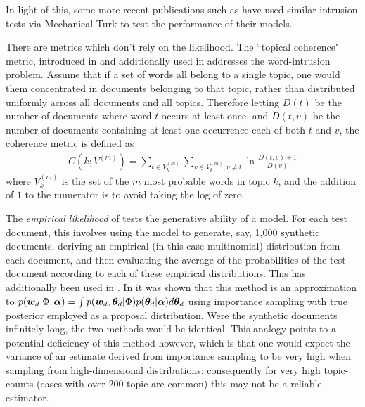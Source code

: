 
In light of this, some more recent publications such as \cite{Li2006}\cite{Wang2007}\cite{Lindsey2012} have used similar intrusion tests via Mechanical Turk to test the performance of their models.

There are metrics which don't rely on the likelihood. The ``topical coherence" metric, introduced in \cite{Mimno2011} and additionally used in \cite{Mimno2012a} addresses the word-intrusion problem. Assume that if a set of words all belong to a single topic, one would them concentrated in documents belonging to that topic, rather than distributed uniformly across all documents and all topics. Therefore letting $D(t)$ be the number of documents where word $t$ occurs at least once, and $D(t,v)$ be the number of documents containing at least one occurrence each of both $t$ and $v$, the coherence metric is defined as
\begin{align}
C(k; V^{(m)}) = \sum_{t \in V^{(m)}_k} \sum_{v \in V^{(m)}_k,  v \neq t} \ln \frac{D(t, v) + 1}{D(v)}
\end{align}
where $V^{(m)}_k$ is the set of the $m$ most probable words in topic $k$, and the addition of $1$ to the numerator is to avoid taking the log of zero. 


The \emph{empirical likelihood} of \cite{Li2006} tests the generative ability of a model. For each test document, this involves using the model to generate, say, 1,000 synthetic documents, deriving an empirical (in this case multinomial) distribution from each document, and then evaluating the average of the probabilities of the test document according to each of these empirical distributions. This has additionally been used in \cite{Doyle2009}\cite{Mimno2008}. In \cite{Wallach2009} it was shown that this method is an approximation to $p(\bm w_d|\Phi, \bm \alpha) = \int p(\bm w_d, { \bm \theta_d } | \Phi)p({ \bm \theta_d }|\bm \alpha)d{ \bm \theta_d }$ using importance sampling with true posterior employed as a proposal distribution. Were the synthetic documents infinitely long, the two methods would be identical. This analogy points to a potential deficiency of this method however, which is that one would expect the variance of an estimate derived from importance sampling to be very high when sampling from high-dimensional distributions: consequently for very high topic-counts (cases with over 200-topic are common) this may not be a reliable estimator.

